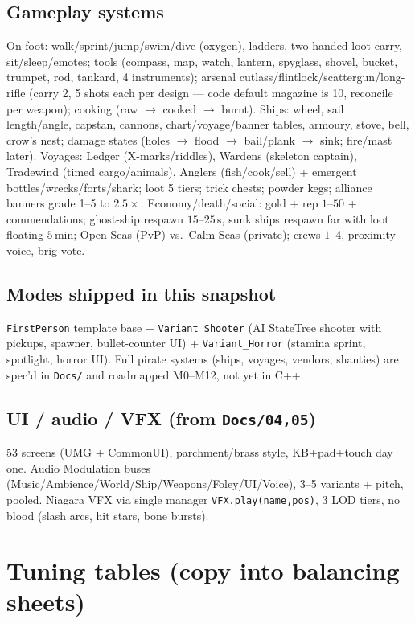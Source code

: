 \documentclass[11pt,a4paper]{article}
\begin{document}
\subsection{Gameplay systems}
On foot: walk/sprint/jump/swim/dive (oxygen), ladders, two-handed loot carry, sit/sleep/emotes; tools (compass, map, watch, lantern, spyglass, shovel, bucket, trumpet, rod, tankard, 4 instruments); arsenal cutlass/flintlock/scattergun/long-rifle (carry 2, 5 shots each per design --- code default magazine is 10, reconcile per weapon); cooking (raw $\rightarrow$ cooked $\rightarrow$ burnt).
Ships: wheel, sail length/angle, capstan, cannons, chart/voyage/banner tables, armoury, stove, bell, crow's nest; damage states (holes $\rightarrow$ flood $\rightarrow$ bail/plank $\rightarrow$ sink; fire/mast later).
Voyages: Ledger (X-marks/riddles), Wardens (skeleton captain), Tradewind (timed cargo/animals), Anglers (fish/cook/sell) + emergent bottles/wrecks/forts/shark; loot 5 tiers; trick chests; powder kegs; alliance banners grade 1--5 to $2.5\times$.
Economy/death/social: gold + rep $1$--$50$ + commendations; ghost-ship respawn $15$--$25$\,s, sunk ships respawn far with loot floating $5$\,min; Open Seas (PvP) vs.\ Calm Seas (private); crews $1$--$4$, proximity voice, brig vote.

\subsection{Modes shipped in this snapshot}
\texttt{FirstPerson} template base + \texttt{Variant\_Shooter} (AI StateTree shooter with pickups, spawner, bullet-counter UI) + \texttt{Variant\_Horror} (stamina sprint, spotlight, horror UI). Full pirate systems (ships, voyages, vendors, shanties) are spec'd in \texttt{Docs/} and roadmapped M0--M12, not yet in C++.

\subsection{UI / audio / VFX (from \texttt{Docs/04,05})}
53 screens (UMG + CommonUI), parchment/brass style, KB+pad+touch day one. Audio Modulation buses (Music/Ambience/World/Ship/Weapons/Foley/UI/Voice), 3--5 variants + pitch, pooled. Niagara VFX via single manager \texttt{VFX.play(name,pos)}, 3 LOD tiers, no blood (slash arcs, hit stars, bone bursts).

\section{Tuning tables (copy into balancing sheets)}
\label{sec:tuning}
\end{document}
